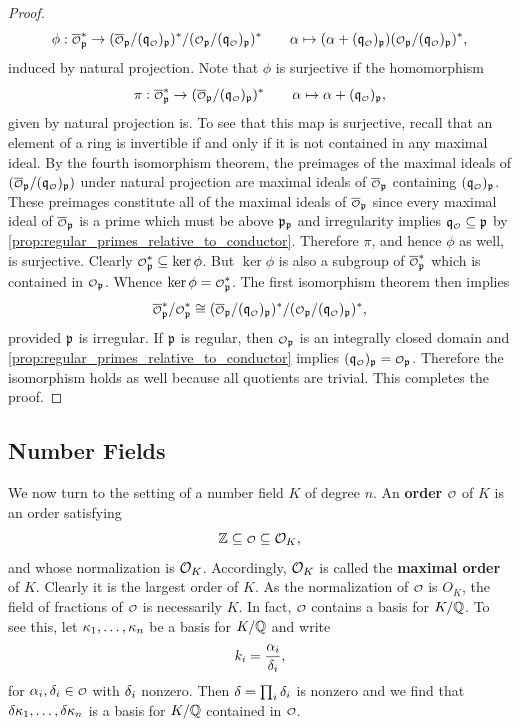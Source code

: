 \begin{proof}
\[        \phi:\conj{\smc{O}}_{\mf{p}}^{\ast} \to (\conj{\smc{O}}_{\mf{p}}/(\mf{q}_{\smc{O}})_{\mf{p}})^{\ast}/(\smc{O}_{\mf{p}}/(\mf{q}_{\smc{O}})_{\mf{p}})^{\ast} \qquad \a \mapsto (\a+(\mf{q}_{\smc{O}})_{\mf{p}})(\smc{O}_{\mf{p}}/(\mf{q}_{\smc{O}})_{\mf{p}})^{\ast},
      \]
      induced by natural projection. Note that \(\phi\) is surjective if the homomorphism
      \[
        \pi:\conj{\smc{O}}_{\mf{p}}^{\ast} \to (\conj{\smc{O}}_{\mf{p}}/(\mf{q}_{\smc{O}})_{\mf{p}})^{\ast} \qquad \a \mapsto \a+(\mf{q}_{\smc{O}})_{\mf{p}},
      \]
      given by natural projection is. To see that this map is surjective, recall that an element of a ring is invertible if and only if it is not contained in any maximal ideal. By the fourth isomorphism theorem, the preimages of the maximal ideals of \((\conj{\smc{O}}_{\mf{p}}/(\mf{q}_{\smc{O}})_{\mf{p}})\) under natural projection are maximal ideals of \(\conj{\smc{O}}_{\mf{p}}\) containing \((\mf{q}_{\smc{O}})_{\mf{p}}\). These preimages constitute all of the maximal ideals of \(\conj{\smc{O}}_{\mf{p}}\) since every maximal ideal of \(\conj{\smc{O}}_{\mf{p}}\) is a prime which must be above \(\mathfrak{p}_{\mathfrak{p}}\) and irregularity implies \(\mf{q}_{\smc{O}} \subseteq \mf{p}\) by \cref{prop:regular_primes_relative_to_conductor}. Therefore \(\pi\), and hence \(\phi\) as well, is surjective. Clearly \(\smc{O}_{\mf{p}}^{\ast} \subseteq \ker\phi\). But \(\ker\phi\) is also a subgroup of \(\conj{\smc{O}}_{\mf{p}}^{\ast}\) which is contained in \(\smc{O}_{\mf{p}}\). Whence \(\ker\phi = \smc{O}_{\mf{p}}^{\ast}\). The first isomorphism theorem then implies
      \[
        \conj{\smc{O}}_{\mf{p}}^{\ast}/\smc{O}_{\mf{p}}^{\ast} \cong (\conj{\smc{O}}_{\mf{p}}/(\mf{q}_{\smc{O}})_{\mf{p}})^{\ast}/(\smc{O}_{\mf{p}}/(\mf{q}_{\smc{O}})_{\mf{p}})^{\ast},
      \]
      provided \(\mathfrak{p}\) is irregular. If \(\mathfrak{p}\) is regular, then \(\smc{O}_{\mf{p}}\) is an integrally closed domain and \cref{prop:regular_primes_relative_to_conductor} implies \((\mf{q}_{\smc{O}})_{\mf{p}} = \smc{O}_{\mf{p}}\). Therefore the isomorphism holds as well because all quotients are trivial. This completes the proof.
    \end{proof}

    \subsection*{Number Fields}
      We now turn to the setting of a number field \(K\) of degree \(n\). An \textbf{order} \(\smc{O}\) of \(K\) is an order satisfying
      \[
        \Z \subseteq \smc{O} \subseteq \mc{O}_{K},
      \]
      and whose normalization is \(\mathcal{O}_{K}\). Accordingly, \(\mathcal{O}_{K}\) is called the \textbf{maximal order} of \(K\). Clearly it is the largest order of \(K\). As the normalization of \(\smc{O}\) is \(O_{K}\), the field of fractions of \(\smc{O}\) is necessarily \(K\). In fact, \(\smc{O}\) contains a basis for \(K/\mathbb{Q}\). To see this, let \(\kappa_{1},\ldots,\kappa_{n}\) be a basis for \(K/\mathbb{Q}\) and write
      \[
        k_{i} = \frac{\alpha_{i}}{\delta_{i}},
      \]
      for \(\a_{i},\d_{i} \in \smc{O}\) with \(\delta_{i}\) nonzero. Then \(\delta = \prod_{i}\delta_{i}\) is nonzero and we find that \(\delta\kappa_{1},\ldots,\delta\kappa_{n}\) is a basis for \(K/\mathbb{Q}\) contained in \(\smc{O}\).

